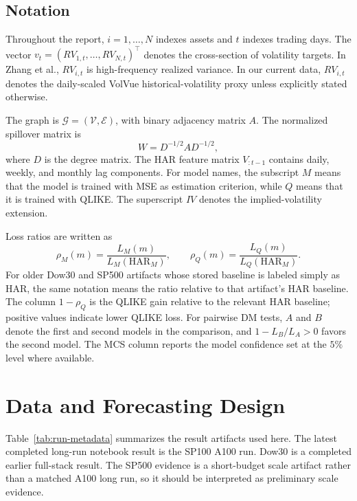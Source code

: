 \documentclass[11pt]{article}
\begin{document}
\subsection{Notation}

Throughout the report, \(i=1,\ldots,N\) indexes assets and \(t\) indexes trading days.
The vector \(v_t=(RV_{1,t},\ldots,RV_{N,t})^\top\) denotes the cross-section of volatility targets.
In Zhang et al., \(RV_{i,t}\) is high-frequency realized variance.
In our current data, \(RV_{i,t}\) denotes the daily-scaled VolVue historical-volatility proxy unless explicitly stated otherwise.

The graph is \(\mathcal{G}=(\mathcal{V},\mathcal{E})\), with binary adjacency matrix \(A\).
The normalized spillover matrix is
\[
  W = D^{-1/2} A D^{-1/2},
\]
where \(D\) is the degree matrix.
The HAR feature matrix \(V_{:t-1}\) contains daily, weekly, and monthly lag components.
For model names, the subscript \(M\) means that the model is trained with MSE as estimation criterion, while \(Q\) means that it is trained with QLIKE.
The superscript \(IV\) denotes the implied-volatility extension.

Loss ratios are written as
\[
  \rho_M(m)=\frac{L_M(m)}{L_M(\mathrm{HAR}_M)},
  \qquad
  \rho_Q(m)=\frac{L_Q(m)}{L_Q(\mathrm{HAR}_M)}.
\]
For older Dow30 and SP500 artifacts whose stored baseline is labeled simply as HAR, the same notation means the ratio relative to that artifact's HAR baseline.
The column \(1-\rho_Q\) is the QLIKE gain relative to the relevant HAR baseline; positive values indicate lower QLIKE loss.
For pairwise DM tests, \(A\) and \(B\) denote the first and second models in the comparison, and \(1-L_B/L_A>0\) favors the second model.
The MCS column reports the model confidence set at the \(5\%\) level where available.

\section{Data and Forecasting Design}

Table~\ref{tab:run-metadata} summarizes the result artifacts used here.
The latest completed long-run notebook result is the SP100 A100 run.
Dow30 is a completed earlier full-stack result.
The SP500 evidence is a short-budget scale artifact rather than a matched A100 long run, so it should be interpreted as preliminary scale evidence.


\end{document}
